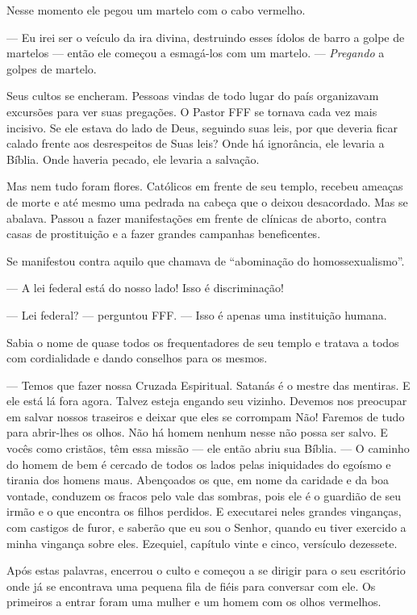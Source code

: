 Nesse momento ele pegou um martelo com o cabo vermelho.

--- Eu irei ser o veículo da ira divina, destruindo esses ídolos de barro a golpe de martelos --- então ele começou a esmagá-los com um martelo. --- \emph{Pregando} a golpes de martelo.

Seus cultos se encheram. Pessoas vindas de todo lugar do país organizavam excursões para ver suas pregações. O Pastor FFF se tornava cada vez mais incisivo. Se ele estava do lado de Deus, seguindo suas leis, por que deveria ficar calado frente aos desrespeitos de Suas leis? Onde há ignorância, ele levaria a Bíblia. Onde haveria pecado, ele levaria a salvação.

Mas nem tudo foram flores. Católicos  em frente de seu templo, recebeu ameaças de morte e até mesmo uma pedrada na cabeça que o deixou desacordado. Mas  se abalava. Passou a fazer manifestações em frente de clínicas de aborto, contra casas de prostituição e a fazer grandes campanhas beneficentes.

Se manifestou contra aquilo que chamava de ``abominação do homossexualismo''.

--- A lei federal está do nosso lado! Isso é discriminação!

--- Lei federal? --- perguntou FFF. --- Isso é apenas uma instituição humana.

Sabia o nome de quase todos os frequentadores de seu templo e tratava a todos com cordialidade e dando conselhos para os mesmos.

--- Temos que fazer nossa Cruzada Espiritual. Satanás é o mestre das mentiras. E ele está lá fora agora. Talvez esteja engando seu vizinho. Devemos nos preocupar em salvar nossos traseiros e deixar que eles se corrompam Não! Faremos de tudo para abrir-lhes os olhos. Não há homem nenhum nesse  não possa ser salvo. E vocês\mudanca{,} como cristãos, têm essa missão --- ele então abriu sua Bíblia. ---  O caminho do homem de bem é cercado de todos os lados pelas iniquidades do egoísmo e tirania dos homens maus. Abençoados os que, em nome da caridade e da boa vontade, conduzem os fracos pelo vale das sombras, pois ele é o guardião de seu irmão e o que encontra os filhos perdidos. E executarei neles grandes vinganças, com castigos de furor, e saberão que eu sou o Senhor, quando eu tiver exercido a minha vingança sobre eles. Ezequiel, capítulo vinte e cinco, versículo dezessete.

Após estas palavras, encerrou o culto e começou a se dirigir para o seu escritório\mudanca{,} onde já se encontrava uma pequena fila de fiéis para conversar com ele. Os primeiros a entrar foram uma mulher e um homem com os olhos vermelhos.

